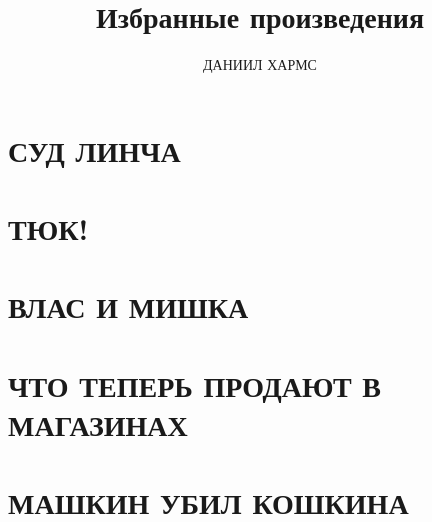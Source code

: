 \documentclass[12pt]{article}
\title{Избранные произведения}
\author{ДАНИИЛ ХАРМС}
\date{}
\begin{document}
\setlength{\parindent}{1.5cm}
\maketitle
\vspace*{-\baselineskip}

\section*{\centering СУД ЛИНЧА}


\section*{\centering ТЮК!}


\section*{\centering ВЛАС И МИШКА}


\section*{\centering ЧТО ТЕПЕРЬ ПРОДАЮТ В МАГАЗИНАХ}


\section*{\centering МАШКИН УБИЛ КОШКИНА}

\end{document}
